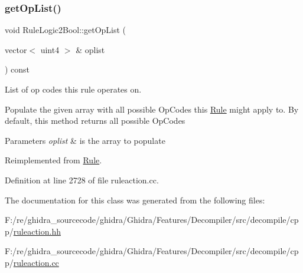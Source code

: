 \subsubsection{\texorpdfstring{getOpList()}{getOpList()}}
{\footnotesize\ttfamily void Rule\+Logic2\+Bool\+::get\+Op\+List (\begin{DoxyParamCaption}\item[{vector$<$ uint4 $>$ \&}]{oplist }\end{DoxyParamCaption}) const\hspace{0.3cm}{\ttfamily [virtual]}}



List of op codes this rule operates on. 

Populate the given array with all possible Op\+Codes this \mbox{\hyperlink{class_rule}{Rule}} might apply to. By default, this method returns all possible Op\+Codes 
\begin{DoxyParams}{Parameters}
{\em oplist} & is the array to populate \\
\hline
\end{DoxyParams}


Reimplemented from \mbox{\hyperlink{class_rule_a4023bfc7825de0ab866790551856d10e}{Rule}}.



Definition at line 2728 of file ruleaction.\+cc.



The documentation for this class was generated from the following files\+:\begin{DoxyCompactItemize}
\item 
F\+:/re/ghidra\+\_\+sourcecode/ghidra/\+Ghidra/\+Features/\+Decompiler/src/decompile/cpp/\mbox{\hyperlink{ruleaction_8hh}{ruleaction.\+hh}}\item 
F\+:/re/ghidra\+\_\+sourcecode/ghidra/\+Ghidra/\+Features/\+Decompiler/src/decompile/cpp/\mbox{\hyperlink{ruleaction_8cc}{ruleaction.\+cc}}\end{DoxyCompactItemize}
